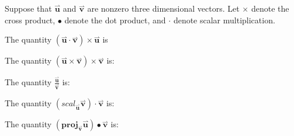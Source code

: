 \documentclass{ximera}
\author{Jim Talamo}
\begin{document}
\begin{exercise}
Suppose that $\overset{\boldsymbol{\rightharpoonup}}{\mathbf{u}} $ and $\overset{\boldsymbol{\rightharpoonup}}{\mathbf{v}} $ are nonzero three dimensional vectors.  Let $\boldsymbol\times$ denote the cross product, $\bullet$ denote the dot product, and $\cdot$ denote scalar multiplication.

The quantity $(\overset{\boldsymbol{\rightharpoonup}}{\mathbf{u}} \cdot \overset{\boldsymbol{\rightharpoonup}}{\mathbf{v}}) \times \overset{\boldsymbol{\rightharpoonup}}{\mathbf{u}}$ is

\begin{multipleChoice}
\end{multipleChoice}



The quantity $(\overset{\boldsymbol{\rightharpoonup}}{\mathbf{u}} \times \overset{\boldsymbol{\rightharpoonup}}{\mathbf{v}})\times \overset{\boldsymbol{\rightharpoonup}}{\mathbf{v}}$ is:

\begin{multipleChoice}
\end{multipleChoice}

The quantity $\frac {\overset{\boldsymbol{\rightharpoonup}}{\mathbf{u}}} {\overset{\boldsymbol{\rightharpoonup}}{\mathbf{v}}}$ is:

\begin{multipleChoice}
\end{multipleChoice}

The quantity $(scal_{\overset{\boldsymbol{\rightharpoonup}}{\mathbf{u}}} \overset{\boldsymbol{\rightharpoonup}}{\mathbf{v}}) \cdot \overset{\boldsymbol{\rightharpoonup}}{\mathbf{v}}$ is:
\begin{multipleChoice}
\end{multipleChoice}

The quantity $(\mathbf{proj}_{\overset{\boldsymbol{\rightharpoonup}}{\mathbf{v}}} \overset{\boldsymbol{\rightharpoonup}}{\mathbf{u}})\bullet \overset{\boldsymbol{\rightharpoonup}}{\mathbf{v}}$ is:

\begin{multipleChoice}
\end{multipleChoice}



\end{exercise}
\end{document}

